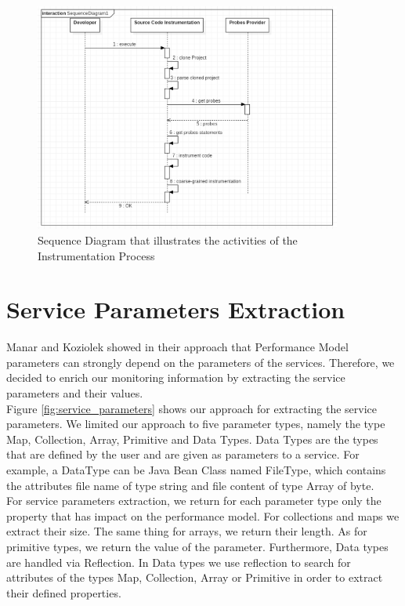 \begin{figure}[h]
\centering
\includegraphics[width=0.9\textwidth]{figures/instrumentation_process}
\caption{Sequence Diagram that illustrates the activities of the Instrumentation Process}
\label{fig:instrumentation_process}
\end{figure}

\section{Service Parameters Extraction}
\label{sec:Service Parameters Extraction}
Manar and Koziolek showed in their approach \cite{mazkatli2018continuous} that Performance Model parameters can strongly depend on the parameters of the services. Therefore, we decided to enrich our monitoring information by extracting the service parameters and their values. \\

Figure \ref{fig:service_parameters} shows our approach for extracting the service parameters. We limited our approach to five parameter types, namely the type Map, Collection, Array, Primitive and Data Types. Data Types are the types that are defined by the user and are given as parameters to a service. For example, a DataType can be Java Bean Class named FileType, which contains the attributes file name of type string and file content of type Array of byte.\\

For service parameters extraction, we return for each parameter type only the property that has impact on the performance model. For collections and maps we extract their size. The same thing for arrays, we return their length. As for primitive types, we return the value of the parameter. Furthermore, Data types are handled via Reflection. In Data types we use reflection to search for attributes of the types Map, Collection, Array or Primitive in order to extract their defined properties. \\


